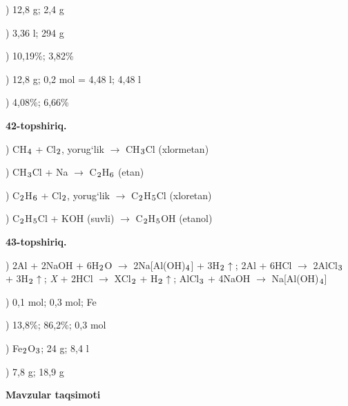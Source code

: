 \documentclass[11pt,a4paper]{article}
\renewcommand{\textsubscript}[1]{\ensuremath{_{\text{\fontsize{8}{8}\selectfont #1}}}}
\begin{document}
) 12,8 g; 2,4 g\par
{}) 3,36 l; 294 g\par
{}) 10,19\%; 3,82\%\par
{}) 12,8 g; 0,2 mol = 4,48 l; 4,48 l\par
{}) 4,08\%; 6,66\%\par
\noindent\textbf{42-topshiriq.}\par
{}) CH\textsubscript{4} + Cl\textsubscript{2}, yorug`lik $\to$ CH\textsubscript{3}Cl (xlormetan)\par
{}) CH\textsubscript{3}Cl + Na $\to$ C\textsubscript{2}H\textsubscript{6} (etan)\par
{}) C\textsubscript{2}H\textsubscript{6} + Cl\textsubscript{2}, yorug`lik $\to$ C\textsubscript{2}H\textsubscript{5}Cl (xloretan)\par
{}) C\textsubscript{2}H\textsubscript{5}Cl + KOH (suvli) $\to$ C\textsubscript{2}H\textsubscript{5}OH (etanol)\par
\noindent\textbf{43-topshiriq.}\par
{}) 2Al + 2NaOH + 6H\textsubscript{2}O $\to$ 2Na[Al(OH)\textsubscript{4}] + 3H\textsubscript{2}$\uparrow$; 2Al + 6HCl $\to$ 2AlCl\textsubscript{3} + 3H\textsubscript{2}$\uparrow$; \textit{X} + 2HCl $\to$ XCl\textsubscript{2} + H\textsubscript{2}$\uparrow$; AlCl\textsubscript{3} + 4NaOH $\to$ Na[Al(OH)\textsubscript{4}]\par
{}) 0,1 mol; 0,3 mol; Fe\par
{}) 13,8\%; 86,2\%; 0,3 mol\par
{}) Fe\textsubscript{2}O\textsubscript{3}; 24 g; 8,4 l\par
{}) 7,8 g; 18,9 g\par
\par\bigskip\noindent\textbf{Mavzular taqsimoti}\par\smallskip
\end{document}
